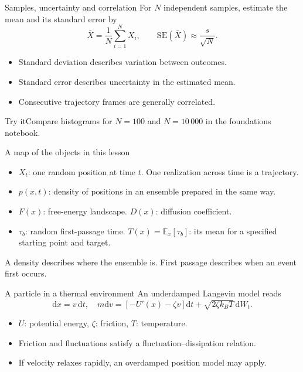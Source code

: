 \documentclass[aspectratio=169,10pt]{beamer}
\newcommand{\dd}{\mathrm{d}}
\begin{document}
\begin{frame}{Samples, uncertainty and correlation}
For $N$ independent samples, estimate the mean and its standard error by
\[\bar X=\frac{1}{N}\sum_{i=1}^{N}X_i,\qquad \mathrm{SE}(\bar X)\approx \frac{s}{\sqrt N}.\]
\begin{itemize}\item Standard deviation describes variation between outcomes.\item Standard error describes uncertainty in the estimated mean.\item Consecutive trajectory frames are generally correlated.\end{itemize}
\begin{block}{Try it}Compare histograms for $N=100$ and $N=10\,000$ in the foundations notebook.\end{block}
\end{frame}

\begin{frame}{A map of the objects in this lesson}
\begin{itemize}
\item $X_t$: one random position at time $t$. One realization across time is a trajectory.
\item $p(x,t)$: density of positions in an ensemble prepared in the same way.
\item $F(x)$: free-energy landscape. $D(x)$: diffusion coefficient.
\item $\tau_b$: random first-passage time. $T(x)=\mathbb E_x[\tau_b]$: its mean for a specified starting point and target.
\end{itemize}
\vspace{0.2cm}A density describes where the ensemble is. First passage describes when an event first occurs.
\end{frame}

\begin{frame}{A particle in a thermal environment}
An underdamped Langevin model reads
\[\dd x=v\,\dd t,\quad m\dd v=[-U'(x)-\zeta v]\dd t+\sqrt{2\zeta k_BT}\,\dd W_t.\]
\begin{itemize}\item $U$: potential energy, $\zeta$: friction, $T$: temperature.\item Friction and fluctuations satisfy a fluctuation--dissipation relation.\item If velocity relaxes rapidly, an overdamped position model may apply.\end{itemize}
\end{frame}
\end{document}
